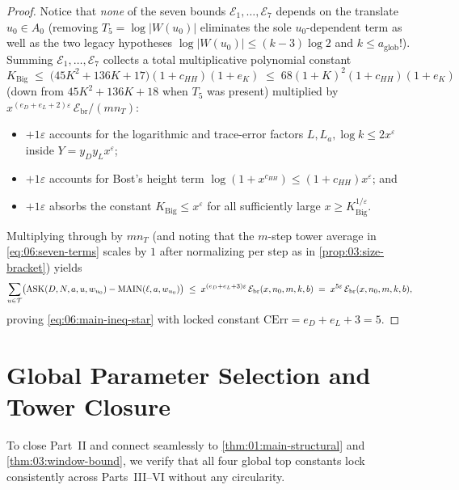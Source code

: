 \begin{proof}
Notice that \emph{none} of the seven bounds $\mathcal{E}_1, \dots, \mathcal{E}_7$ depends on the translate $u_0 \in A_0$ (removing $T_5 = \log|W(u_0)|$ eliminates the sole $u_0$-dependent term as well as the two legacy hypotheses $\log|W(u_0)| \le (k-3)\log 2$ and $k \le a_{\mathrm{glob}}$!). Summing $\mathcal{E}_1, \dots, \mathcal{E}_7$ collects a total multiplicative polynomial constant
\[
  K_{\mathrm{Big}} \;\le\; \bigl(45 K^2 + 136 K + 17\bigr)(1 + c_{HH})(1 + e_K) \;\le\; 68(1 + K)^2(1 + c_{HH})(1 + e_K)
\]
(down from $45K^2 + 136K + 18$ when $T_5$ was present) multiplied by $x^{(e_D + e_L + 2)\varepsilon}\,\mathcal{E}_{\mathrm{br}} / (m n_T)$:
\begin{itemize}
\item $+1\varepsilon$ accounts for the logarithmic and trace-error factors $L, L_a, \log k \le 2x^\varepsilon$ inside $Y = y_D y_L x^\varepsilon$;
\item $+1\varepsilon$ accounts for Bost's height term $\log(1 + x^{c_{HH}}) \le (1 + c_{HH}) x^\varepsilon$; and
\item $+1\varepsilon$ absorbs the constant $K_{\mathrm{Big}} \le x^\varepsilon$ for all sufficiently large $x \ge K_{\mathrm{Big}}^{1/\varepsilon}$.
\end{itemize}
Multiplying through by $m n_T$ (and noting that the $m$-step tower average in \eqref{eq:06:seven-terms} scales by $1$ after normalizing per step as in \cref{prop:03:size-bracket}) yields
\[
  \sum_{u \in \mathcal{T}}\bigl(\mathrm{ASK}(D, N, a, u, w_{u_0}) - \mathrm{MAIN}(\ell, a, w_{u_0})\bigr)
  \;\le\; x^{(e_D + e_L + 3)\varepsilon}\,\mathcal{E}_{\mathrm{br}}(x, n_0, m, k, b)
  \;=\; x^{5\varepsilon}\,\mathcal{E}_{\mathrm{br}}(x, n_0, m, k, b),
\]
proving \eqref{eq:06:main-ineq-star} with locked constant $\mathrm{CErr} = e_D + e_L + 3 = 5$.
\end{proof}

\section{Global Parameter Selection and Tower Closure}
\label{sec:06:global-assembly}

To close Part~II and connect seamlessly to \cref{thm:01:main-structural} and \cref{thm:03:window-bound}, we verify that all four global top constants lock consistently across Parts~III--VI without any circularity.

